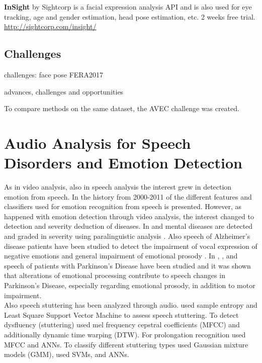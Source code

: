 \textbf{InSight} by Sightcorp is a facial expression analysis API and is also used for eye tracking, age and gender estimation, head pose estimation, etc. 2 weeks free trial.
\url{http://sightcorp.com/insight/}\\


\subsection{Challenges}
challenges: face pose FERA2017 \cite{Valstar2017}

 advances, challenges and opportunities \cite{Martinez2016}

To compare methods on the same dataset, the AVEC challenge was created. \cite{Valstar2016avec}\cite{Valstar2014avec}



\section{Audio Analysis for Speech Disorders and Emotion Detection}

As in video analysis, also in speech analysis the interest grew in detection emotion from speech. In \cite{Anagnostopoulos2015survey} the history from 2000-2011 of the different features and classifiers used for emotion recognition from speech is presented. However, as happened with emotion detection through video analysis, the interest changed to detection and severity deduction of diseases. In \cite{Cummins2016} and \cite{Singh2017}mental diseases are detected and graded in severity using paralinguistic analysis . Also speech of Alzheimer's disease patients have been studied \cite{Lopez-de-Ipina2015b}\cite{Lopez-de-Ipina2014} to detect the 
impairment of vocal expression of negative emotions\cite{Zaytseva2014} \cite{Lopez-de-Ipina2015} and general impairment of emotional prosody \cite{Horley2010}. In  \cite{Schuller2015interspeech}, \cite{Moebes2008}, and \cite{Zhao2014} speech of patients with Parkinson's Disease have been studied and it was shown that alterations of emotional processing contribute to speech changes in Parkinson's Disease, especially regarding emotional prosody, in addition to motor impairment.\\

Also speech stuttering has been analyzed through audio. \cite{Hariharan2012} used sample entropy and Least Square Support Vector Machine to assess speech stuttering. To detect dysfluency (stuttering) \cite{jhawar2016speech} used mel frequency cepstral coefficients (MFCC) and \cite{Ramteke2016} additionally dynamic time warping (DTW). For prolongation recognition \cite{Chee2009} used MFCC and \cite{Savin2016} ANNs. To classify different stuttering types \cite{Mahesha2016} used Gaussian mixture models (GMM), \cite{Mahesha2015} used SVMs, and \cite{Pravin2017} ANNs.


